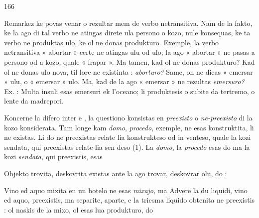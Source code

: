 \begin{VUpage}[170]{166}

Remarkez ke  povas venar o rezultar mem de verbo\nl
netransitiva. Nam de la fakto, ke la ago di tal verbo ne\nl
atingas direte ula persono o kozo, nule konsequas, ke ta\nl
verbo ne produktas ulo, ke ol ne donas produkturo. Exemple,\nl
la verbo netransitiva « abortar » certe ne atingas ulu od\nl
ulo; la ago « abortar » ne pasas a persono od a kozo, quale\nl
« frapar ». Ma tamen, kad ol ne donas produkturo? Kad ol\nl
ne donas ulo nova, til lore ne existinta : \textit{aborturo?} Same,\nl
on ne dicas « emersar » ulu, o « emersar » ulo. Ma, kad\nl
de la ago « emersar » ne rezultas \textit{emersuro?} Ex. : Multa\nl
insuli esas emersuri ek l'oceano; li produktesis o subite da\nl
tertremo, o lente da madrepori.

Koncerne la difero inter  e , la questiono konsistas\nl
en \textit{preexisto} o \textit{ne-preexisto} di la kozo konsiderata. Tam longe\nl
kam \textit{domo}, \textit{procedo}, exemple, ne esas konstruktita, li ne\nl
existas. Li do ne preexistas relate lia konstrukteso od in\cc
venteso, quale la kozi sendata, qui preexistas relate lia sen\cc
deso (1). La \textit{domo}, la \textit{procedo} esas do \cc
{} ma la kozi \textit{sendata,} qui preexistis, esas 

Objekto trovita, deskovrita existas ante la ago trovar,\nl
deskovrar olu, do : \cc
{}

Vino ed aquo mixita en un botelo ne esas \textit{mixajo,} ma\nl
{} Advere la du liquidi, vino ed aquo, preexistis, ma\nl
separite, aparte, e la triesma liquido obtenita ne preexistis :\nl
ol naskis de la mixo, ol esas lua produkturo, do 


\end{VUpage}
